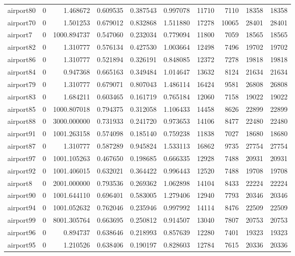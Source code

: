 \begin{longtable}{|l|r|r|r|r|r|r|r|r|r|}
airport80 & 0 & 1.468672 & 0.609535 & 0.387543 & 0.997078 & 11710 & 7110 & 18358 & 18358 \\
airport70 & 0 & 1.501253 & 0.679012 & 0.832868 & 1.511880 & 17278 & 10065 & 28401 & 28401 \\
airport7 & 0 & 1000.894737 & 0.547060 & 0.232034 & 0.779094 & 11800 & 7059 & 18565 & 18565 \\
airport82 & 0 & 1.310777 & 0.576134 & 0.427530 & 1.003664 & 12498 & 7496 & 19702 & 19702 \\
airport86 & 0 & 1.310777 & 0.521894 & 0.326191 & 0.848085 & 12372 & 7278 & 19818 & 19818 \\
airport84 & 0 & 0.947368 & 0.665163 & 0.349484 & 1.014647 & 13632 & 8124 & 21634 & 21634 \\
airport79 & 0 & 1.310777 & 0.679071 & 0.807043 & 1.486114 & 16424 & 9581 & 26808 & 26808 \\
airport83 & 0 & 1.684211 & 0.603465 & 0.161719 & 0.765184 & 12060 & 7158 & 19022 & 19022 \\
airport85 & 0 & 1000.807018 & 0.794375 & 0.312058 & 1.106433 & 14458 & 8626 & 22899 & 22899 \\
airport88 & 0 & 3000.000000 & 0.731933 & 0.241720 & 0.973653 & 14106 & 8477 & 22480 & 22480 \\
airport91 & 0 & 1001.263158 & 0.574098 & 0.185140 & 0.759238 & 11838 & 7027 & 18680 & 18680 \\
airport87 & 0 & 1.310777 & 0.587289 & 0.945824 & 1.533113 & 16862 & 9735 & 27754 & 27754 \\
airport97 & 0 & 1001.105263 & 0.467650 & 0.198685 & 0.666335 & 12928 & 7488 & 20931 & 20931 \\
airport92 & 0 & 1001.406015 & 0.632021 & 0.364422 & 0.996443 & 12520 & 7488 & 19708 & 19708 \\
airport8 & 0 & 2001.000000 & 0.793536 & 0.269362 & 1.062898 & 14104 & 8433 & 22224 & 22224 \\
airport90 & 0 & 1001.644110 & 0.696401 & 0.583005 & 1.279406 & 12940 & 7793 & 20346 & 20346 \\
airport94 & 0 & 1001.052632 & 0.762046 & 0.235946 & 0.997992 & 14114 & 8476 & 22509 & 22509 \\
airport99 & 0 & 8001.305764 & 0.663695 & 0.250812 & 0.914507 & 13040 & 7807 & 20753 & 20753 \\
airport96 & 0 & 0.894737 & 0.638646 & 0.218993 & 0.857639 & 12280 & 7401 & 19323 & 19323 \\
airport95 & 0 & 1.210526 & 0.638406 & 0.190197 & 0.828603 & 12784 & 7615 & 20336 & 20336 \\

\end{longtable}
